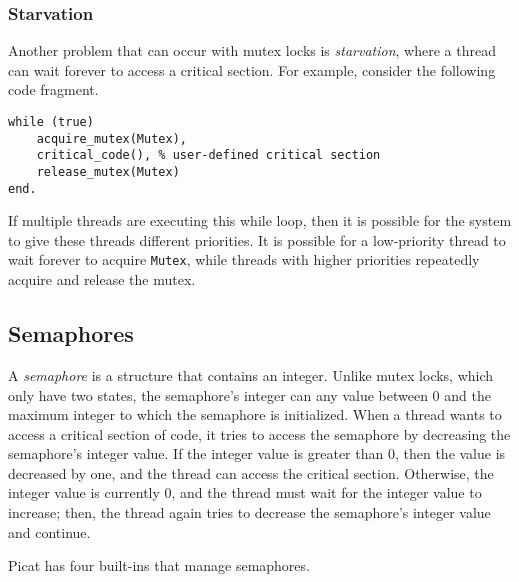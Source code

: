 \subsubsection{Starvation}
Another problem that can occur with mutex locks is \emph{starvation}, where a thread can wait forever to access a critical section.  For example, consider the following code fragment.

\begin{verbatim}
while (true)
    acquire_mutex(Mutex),
    critical_code(), % user-defined critical section
    release_mutex(Mutex)
end.
\end{verbatim}

If multiple threads are executing this while loop, then it is possible for the system to give these threads different priorities.  It is possible for a low-priority thread to wait forever to acquire \texttt{Mutex}, while threads with higher priorities repeatedly acquire and release the mutex.

\subsection{Semaphores}
A \emph{semaphore} is a structure that contains an integer.  Unlike mutex locks, which only have two states, the semaphore's integer can any value between $0$ and the maximum integer to which the semaphore is initialized.  When a thread wants to access a critical section of code, it tries to access the semaphore by decreasing the semaphore's integer value.  If the integer value is greater than $0$, then the value is decreased by one, and the thread can access the critical section.  Otherwise, the integer value is currently $0$, and the thread must wait for the integer value to increase; then, the thread again tries to decrease the semaphore's integer value and continue.

Picat has four built-ins that manage semaphores.

